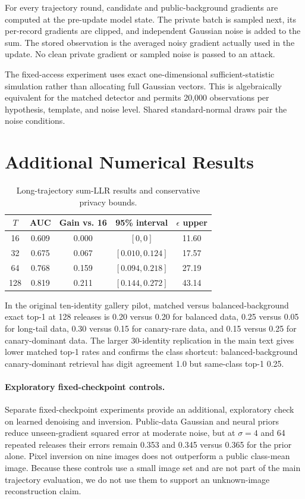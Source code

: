 \documentclass[conference]{IEEEtran}
\begin{document}
For every trajectory round, candidate and public-background gradients are computed at the pre-update model state. The private batch is sampled next, its per-record gradients are clipped, and independent Gaussian noise is added to the sum. The stored observation is the averaged noisy gradient actually used in the update. No clean private gradient or sampled noise is passed to an attack.

The fixed-access experiment uses exact one-dimensional sufficient-statistic simulation rather than allocating full Gaussian vectors. This is algebraically equivalent for the matched detector and permits 20,000 observations per hypothesis, template, and noise level. Shared standard-normal draws pair the noise conditions.

\section{Additional Numerical Results}

\begin{table}[h]
\caption{Long-trajectory sum-LLR results and conservative privacy bounds.}
\centering
\begin{tabular}{ccccc}
\toprule
$T$ & AUC & Gain vs. 16 & 95\% interval & $\epsilon$ upper \\
\midrule
16 & 0.609 & 0.000 & $[0,0]$ & 11.60 \\
32 & 0.675 & 0.067 & $[0.010,0.124]$ & 17.57 \\
64 & 0.768 & 0.159 & $[0.094,0.218]$ & 27.19 \\
128 & 0.819 & 0.211 & $[0.144,0.272]$ & 43.14 \\
\bottomrule
\end{tabular}
\end{table}

In the original ten-identity gallery pilot, matched versus balanced-background exact top-1 at 128 releases is 0.20 versus 0.20 for balanced data, 0.25 versus 0.05 for long-tail data, 0.30 versus 0.15 for canary-rare data, and 0.15 versus 0.25 for canary-dominant data. The larger 30-identity replication in the main text gives lower matched top-1 rates and confirms the class shortcut: balanced-background canary-dominant retrieval has digit agreement 1.0 but same-class top-1 0.25.

\paragraph{Exploratory fixed-checkpoint controls.}
Separate fixed-checkpoint experiments provide an additional, exploratory check on learned denoising and inversion. Public-data Gaussian and neural priors reduce unseen-gradient squared error at moderate noise, but at $\sigma=4$ and 64 repeated releases their errors remain 0.353 and 0.345 versus 0.365 for the prior alone. Pixel inversion on nine images does not outperform a public class-mean image. Because these controls use a small image set and are not part of the main trajectory evaluation, we do not use them to support an unknown-image reconstruction claim.
\end{document}

